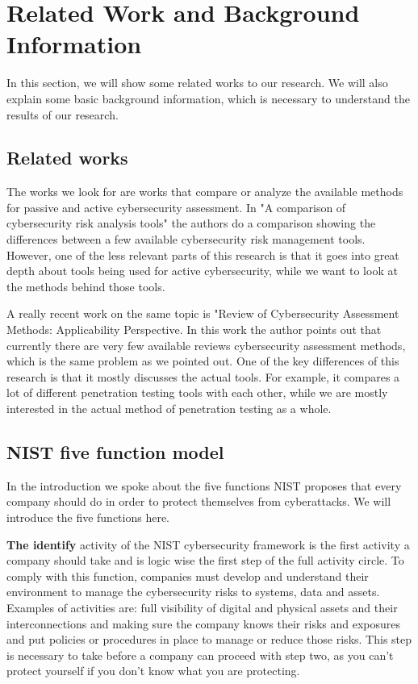 \newpage
\section{Related Work and Background Information}
In this section, we will show some related works to our research. We will also explain some basic background information, which is necessary to understand the results of our research.

\subsection{Related works}
The works we look for are works that compare or analyze the available methods for passive and active cybersecurity assessment. In "A comparison of cybersecurity risk analysis tools"\citep{ROLDANMOLINA2017568} the authors do a comparison showing the differences between a few available cybersecurity risk management tools. However, one of the less relevant parts of this research is that it goes into great depth about tools being used for active cybersecurity, while we want to look at the methods behind those tools.

A really recent work on the same topic is "Review of Cybersecurity Assessment Methods: Applicability \newline Perspective\citep{LESZCZYNA2021102376}. In this work the author points out that currently there are very few available reviews cybersecurity assessment methods, which is the same problem as we pointed out. One of the key differences of this research is that it mostly discusses the actual tools. For example, it compares a lot of different penetration testing tools with each other, while we are mostly interested in the actual method of penetration testing as a whole.

\subsection{NIST five function model}
In the introduction we spoke about the five functions NIST proposes that every company should do in order to protect themselves from cyberattacks. We will introduce the five functions here.


\textbf{The identify}
 activity of the NIST cybersecurity framework is the first activity a company should take and is logic wise the first step of the full activity circle. To comply with this function, companies must develop and understand their environment to manage the cybersecurity risks to systems, data and assets. Examples of activities are: full visibility of digital and physical assets and their interconnections and making sure the company knows their risks and exposures and put policies or procedures in place to manage or reduce those risks. This step is necessary to take before a company can proceed with step two, as you can't protect yourself if you don't know what you are protecting.

